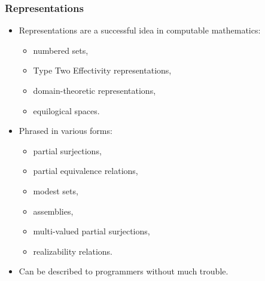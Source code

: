 \documentclass[t]{beamer}
\begin{document}
\begin{frame}
  \frametitle{Representations}

  \begin{itemize}
  \item Representations are a successful idea in computable
    mathematics:
    \begin{itemize}[<.->]
    \item numbered sets,
    \item Type Two Effectivity representations,
    \item domain-theoretic representations,
    \item equilogical spaces.
    \end{itemize}
  \item Phrased in various forms:
    \begin{itemize}[<.->]
    \item partial surjections,
    \item partial equivalence relations,
    \item modest sets,
    \item assemblies,
    \item multi-valued partial surjections,
    \item realizability relations.
    \end{itemize}
  \item Can be described to programmers without much trouble.
  \end{itemize}
\end{frame}
\end{document}
